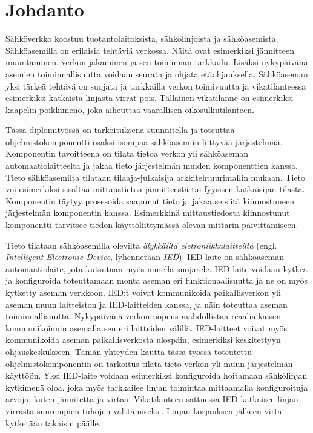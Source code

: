 \chapter{Johdanto}
\label{ch:johdanto}
Sähköverkko koostuu tuotantolaitoksista, sähkölinjoista ja sähköasemista. Sähköasemilla on erilaisia tehtäviä verkossa. Näitä ovat esimerkiksi jännitteen muuntaminen, verkon jakaminen ja sen toiminnan tarkkailu. Lisäksi nykypäivänä asemien toiminnallisuutta voidaan seurata ja ohjata etäohjauksella. Sähköaseman yksi tärkeä tehtävä on suojata ja tarkkailla verkon toimivuutta ja vikatilanteessa esimerkiksi katkaista linjasta virrat pois. Tällainen vikatilanne on esimerkiksi kaapelin poikkimeno, joka aiheuttaa vaarallisen oikosulkutilanteen.

Tässä diplomityössä on tarkoituksena suunnitella ja toteuttaa ohjelmistokomponentti osaksi isompaa sähköasemiin liittyvää järjestelmää. Komponentin tavoitteena on tilata tietoa verkon yli sähköaseman automaatiolaitteelta ja jakaa tieto järjestelmän muiden komponenttien kanssa. Tieto sähköasemilta tilataan tilaaja-julkaisija arkkitehtuurimallin mukaan. Tieto voi esimerkiksi sisältää mittaustietoa jännitteestä tai fyysisen katkaisijan tilasta. Komponentin täytyy prosesoida saapunut tieto ja jakaa se siitä kiinnostuneen järjestelmän komponentin kanssa. Esimerkkinä mittaustiedosta kiinnostunut komponentti tarvitsee tiedon käyttöliittymässä olevan mittarin päivittämiseen.

Tieto tilataan sähköasemilla olevilta \emph{älykkäiltä eletroniikkalaitteilta} (engl. \emph{Intelligent Electronic Device}, lyhennetään \emph{IED}). IED-laite on sähköaseman automaatiolaite, jota kutsutaan myös nimellä suojarele. IED-laite voidaan kytkeä ja konfiguroida toteuttamaan monta aseman eri funktionaalisuutta ja ne on myös kytketty aseman verkkoon. IED:t voivat kommunikoida paikallisverkon yli aseman muun laitteiston ja IED-laitteiden kanssa, ja näin toteuttaa aseman toiminnallisuutta. Nykypäivänä verkon nopeus mahdollistaa reaaliaikaisen kommunikoinnin asemalla sen eri laitteiden välillä. IED-laitteet voivat myös kommunikoida aseman paikallisverkosta ulospäin, esimerkiksi keskitettyyn ohjauskeskukseen. Tämän yhteyden kautta tässä työssä toteutettu ohjelmistokomponentin on tarkoitus tilata tieto verkon yli muun järjestelmän käyttöön. Yksi IED-laite voidaan esimerkiksi konfiguroida hoitamaan sähkölinjan kytkimenä oloa, joka myös tarkkailee linjan toimintaa mittaamalla konfiguroituja arvoja, kuten jännitettä ja virtaa. Vikatilanteen sattuessa IED katkaisee linjan virrasta suurempien tuhojen välttämiseksi. Linjan korjauksen jälkeen virta kytketään takaisin päälle.

